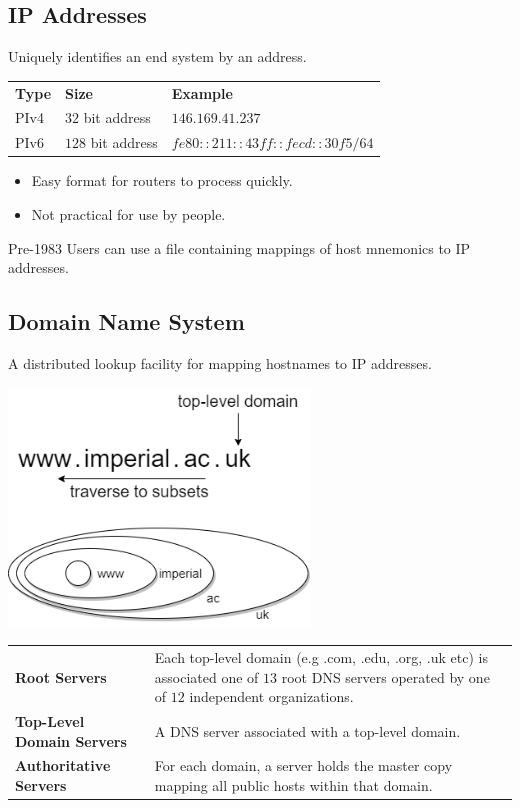 \subsection{IP Addresses}
Uniquely identifies an end system by an address.
\begin{center}
    \begin{tabular}{l l l}
        \textbf{Type} & \textbf{Size}     & \textbf{Example}                 \\
        PIv4          & $32$ bit address  & $146.169.41.237$                 \\
        PIv6          & $128$ bit address & $fe80::211::43ff::fecd::30f5/64$ \\
    \end{tabular}
\end{center}
\begin{itemize}
    \setlength\itemsep{0em}
    \item Easy format for routers to process quickly.
    \item Not practical for use by people.
\end{itemize}
\begin{sidenotebox}{Pre-1983}
    Users can use a file containing mappings of host mnemonics to IP addresses.
\end{sidenotebox}

\subsection{Domain Name System}
A distributed lookup facility for mapping hostnames to IP addresses.
\begin{center}\includegraphics[width=0.6\textwidth]{the_web/images/domains.png}\end{center}
\begin{tabular}{l p{}}
    \textbf{Root Servers}             & Each top-level domain (e.g .com, .edu, .org, .uk etc) is associated one of $13$ root DNS servers operated by one of $12$ independent organizations. \\
    \textbf{Top-Level Domain Servers} & A DNS server associated with a top-level domain.                                                                                                    \\
    \textbf{Authoritative Servers}    & For each domain, a server holds the master copy mapping all public hosts within that domain.                                                        \\
\end{tabular}

